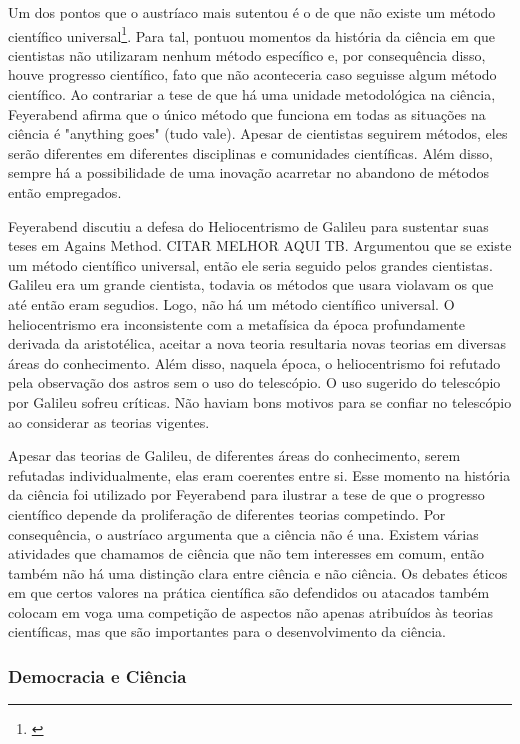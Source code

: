 \documentclass[12pt]{report}
\begin{document}
			Um dos pontos que o austríaco mais sutentou é o de que não existe um método científico universal\footnote{\cite{feyerabend-against-method}}. Para tal, pontuou momentos da história da ciência em que cientistas não utilizaram nenhum método específico e, por consequência disso, houve progresso científico, fato que não aconteceria caso seguisse algum método científico. Ao contrariar a tese de que há uma unidade metodológica na ciência, Feyerabend afirma que o único método que funciona em todas as situações na ciência é "anything goes" (tudo vale). Apesar de cientistas seguirem métodos, eles serão diferentes em diferentes disciplinas e comunidades científicas. Além disso, sempre há a possibilidade de uma inovação acarretar no abandono de métodos então empregados.
			
			Feyerabend discutiu a defesa do Heliocentrismo de Galileu para sustentar suas teses em Agains Method. CITAR MELHOR AQUI TB. Argumentou que se existe um método científico universal, então ele seria seguido pelos grandes cientistas. Galileu era um grande cientista, todavia os métodos que usara violavam os que até então eram segudios. Logo, não há um método científico universal. O heliocentrismo era inconsistente com a metafísica da época profundamente derivada da aristotélica, aceitar a nova teoria resultaria novas teorias em diversas áreas do conhecimento. Além disso, naquela época, o heliocentrismo foi refutado pela observação dos astros sem o uso do telescópio. O uso sugerido do telescópio por Galileu sofreu críticas. Não haviam bons motivos para se confiar no telescópio ao considerar as teorias vigentes.
			
			Apesar das teorias de Galileu, de diferentes áreas do conhecimento, serem refutadas individualmente, elas eram coerentes entre si. Esse momento na história da ciência foi utilizado por Feyerabend para ilustrar a tese de que o progresso científico depende da proliferação de diferentes teorias competindo. Por consequência, o austríaco argumenta que a ciência não é una. Existem várias atividades que chamamos de ciência que não tem interesses em comum, então também não há uma distinção clara entre ciência e não ciência. Os debates éticos em que certos valores na prática científica são defendidos ou atacados também colocam em voga uma competição de aspectos não apenas atribuídos às teorias científicas, mas que são importantes para o desenvolvimento da ciência.
			
		\subsubsection{Democracia e Ciência}
		
\end{document}
